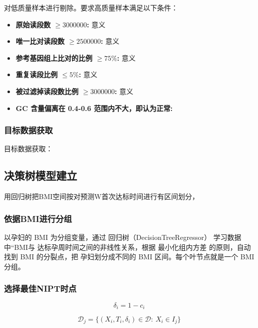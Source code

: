 \documentclass[withoutpreface,notoc]{cumcmthesis}
\begin{document}
	对低质量样本进行剔除。要求高质量样本满足以下条件：
	\begin{itemize}[itemindent=2em]
		\item \textbf{原始读段数 $\geq 3000000$:} 意义
		\item \textbf{唯一比对读段数 $\geq 2500000$:} 意义
		\item \textbf{参考基因组上比对的比例 $\geq 75\%$:} 意义
		\item \textbf{重复读段比例 $\leq 5\%$:} 意义
		\item \textbf{被过滤掉读段数比例 $\geq 3000000$:} 意义
		\item \textbf{GC 含量偏离在 0.4-0.6 范围内不大，即认为正常:} 
	\end{itemize}

	\subsubsection{目标数据获取}


	目标数据获取：


	\subsection{决策树模型建立}

	用回归树把BMI空间按对预测W首次达标时间进行有区间划分，

	\subsubsection{依据BMI进行分组}

	以孕妇的 BMI 为分组变量，通过 回归树（DecisionTreeRegressor） 学习数据中“BMI与
	达标孕周时间之间的非线性关系，根据 最小化组内方差 的原则，自动找到 BMI 的分裂点，把
	孕妇划分成不同的 BMI 区间。每个叶节点就是一个 BMI 分组。

	\subsubsection{选择最佳NIPT时点}




	\begin{equation*}  
		\delta_i = 1 - c_i
	\end{equation*}

	\begin{equation*}
		\mathcal{D}_j = \{(X_i,T_i,\delta_i)\in\mathcal{D}:\ X_i\in I_j\}
	\end{equation*}
\end{document}
